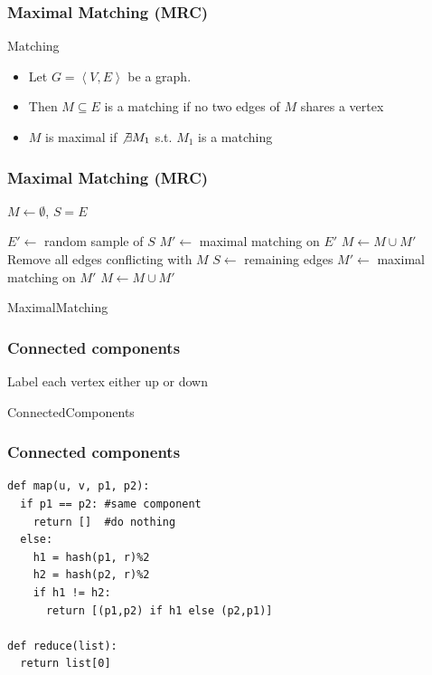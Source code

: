 \documentclass[12pt,aspectratio=169]{beamer}
\begin{document}
\begin{frame}\frametitle{Maximal Matching (MRC)}
  \begin{block}{Matching}
    \begin{itemize}
    \item
      Let $G=\left\langle V,E \right\rangle $ be a graph.
    \item
      Then $M\subseteq E$ is a matching if no two edges of $M$ shares a vertex
    \item
      $M$ is maximal if $\not\exists M_{1}$ s.t. $M_{1}$ is a matching
    \end{itemize}
  \end{block}
\end{frame}

\begin{frame}\frametitle{Maximal Matching (MRC)}
  \begin{algorithm}[H]

    $M\gets \emptyset$, $S=E$\;

    $E'\gets$ random sample of $S$\;
    \;
    $M'\gets$ maximal matching on $E'$ 
    $M\gets M\cup M'$\;
    Remove all edges conflicting with $M$\;
    $S\gets $ remaining edges\;
    \;
    $M'\gets$ maximal matching on $M'$ 
    $M\gets M\cup M'$\;
    \label{alg:MRC-MC2}
    \caption{MaximalMatching}
  \end{algorithm}
\end{frame}

\begin{frame}\frametitle{Connected components}
  \begin{algorithm}[H]
    Label each vertex either \alert{up} or \alert{down}\;
    \caption{ConnectedComponents}
  \end{algorithm}
\end{frame}


\begin{frame}[fragile]\frametitle{Connected components}
  \begin{verbatim}
def map(u, v, p1, p2):
  if p1 == p2: #same component
    return []  #do nothing
  else:
    h1 = hash(p1, r)%2
    h2 = hash(p2, r)%2
    if h1 != h2:
      return [(p1,p2) if h1 else (p2,p1)]

def reduce(list):
  return list[0]
\end{verbatim}
\end{frame}
\end{document}

